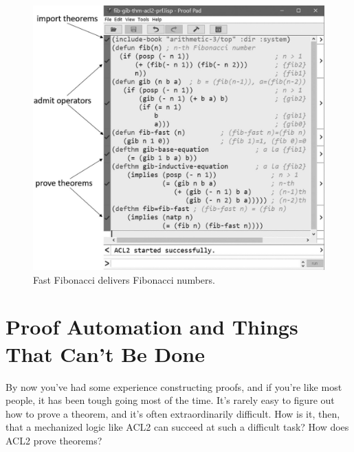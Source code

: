 \begin{figure}
\begin{center}
\includegraphics[scale=1]{images-cmyk/fib-gib-thm-acl2-prf}
\end{center}
\caption{Fast Fibonacci delivers Fibonacci numbers.}
\label{fig:fib-gib-thm}
\end{figure}

\begin{exercises}


\end{exercises}

\section{Proof Automation and Things That Can't Be Done}
\label{sec:halting-problem}

By now you've had some experience constructing proofs, and if you're like most people,
it has been tough going most of the time.
It's rarely easy to figure out how to prove a theorem,
and it's often extraordinarily difficult.
How is it, then, that a mechanized logic like ACL2 can succeed at such a difficult task?
How does ACL2 prove theorems?

